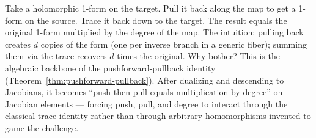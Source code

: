 \begin{layman}
Take a holomorphic 1-form on the target. Pull it back along the map
to get a 1-form on the source. Trace it back down to the target. The
result equals the original 1-form multiplied by the degree of the
map. The intuition: pulling back creates \(d\) copies of the form (one
per inverse branch in a generic fiber); summing them via the trace
recovers \(d\) times the original. Why bother? This is the algebraic
backbone of the pushforward-pullback identity
(Theorem~\ref{thm:pushforward-pullback}). After dualizing and
descending to Jacobians, it becomes ``push-then-pull equals
multiplication-by-degree'' on Jacobian elements --- forcing push, pull,
and degree to interact through the classical trace identity rather
than through arbitrary homomorphisms invented to game the challenge.
\end{layman}
